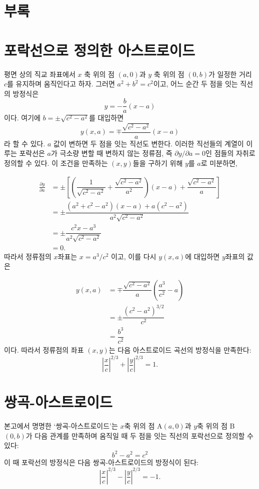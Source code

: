 \documentclass[twocolumn]{article}
\begin{document}
\appendix
\section*{부록}
\newcommand{\pd}[2]{{\frac{\partial #1}{\partial #2}}}
\newcommand{\ilpd}[2]{{{\partial #1}/{\partial #2}}}
\section{포락선으로 정의한 아스트로이드} \label{app:astroid}
평면 상의 직교 좌표에서 $x$ 축 위의 점  $(a, 0)$과 $y$ 축 위의 점 $(0, b)$가 일정한 거리 $c$를 유지하며 움직인다고 하자. 그러면 $a^2+b^2=c^2$이고, 어느 순간 두 점을 잇는 직선의 방정식은 
$$y=-\dfrac{b}{a}(x-a)$$
이다. 여기에 
$b=\pm \sqrt{c^2-a^2}$를 대입하면 
$$y(x, a) = \mp \dfrac{\sqrt{c^2-a^2}}{a}(x-a)$$
라 할 수 있다. 
$a$ 값이 변하면 두 점을 잇는 직선도 변한다. 이러한 직선들의 계열이 이루는 포락선은 $a$가 극소량 변할 때 변하지 않는 정류점, 즉
$\ilpd{y}{a} = 0$인 점들의 자취로 정의할 수 있다. 이 조건을 만족하는 $(x, y)$들을 구하기 위해 $y$를 $a$로 미분하면,

$$ \begin{aligned}
\pd{y}{a} &= \pm\left[\left( \dfrac{1}{\sqrt{c^2-a^2}}+\dfrac{\sqrt{c^2-a^2}}{a^2}\right) (x-a) + \dfrac{\sqrt{c^2-a^2}}{a} \right]\\
	&= \pm \dfrac{(a^2+c^2-a^2)(x-a)+a(c^2-a^2)}{a^2\sqrt{c^2-a^2}}\\
	&= \pm \dfrac{c^2 x - a^3}{a^2 \sqrt{c^2 - a^2}}\\
	&= 0.
\end{aligned}
$$
따라서 정류점의 $x$좌표는 $x = a^3/c^2$ 이고, 이를 다시 $y(x, a)$에 대입하면 $y$좌표의 값은

$$ \begin{aligned}
y(x, a) &= \mp \dfrac{\sqrt{c^2-a^2}}{a}\left(\dfrac{a^3}{c^2}-a\right)\\
	& = \pm \dfrac{\left( c^2- a^2 \right)^{3/2}}{c^2}\\
	& = \dfrac{b^3}{c^2}
\end{aligned}
$$
이다. 따라서 정류점의 좌표 $(x, y)$는 다음 아스트로이드 곡선의 방정식을 만족한다:
$$ \left|\dfrac{x}{c}\right|^{2/3} + \left|\dfrac{y}{c}\right|^{2/3} = 1. $$

\section{쌍곡-아스트로이드}\label{app:hyperastroid}
본고에서 명명한 `쌍곡-아스트로이드'는 $x$축 위의 점 A$(a, 0)$과 $y$축 위의 점 B$(0, b)$가 다음 관계를 만족하며 움직일 때 두 점을 잇는 직선의 포락선으로 정의할 수 있다:
$$b^2-a^2=c^2$$
이 때 포락선의 방정식은 다음 쌍곡-아스트로이드의 방정식이 된다:
$$ \left|\dfrac{x}{c}\right|^{2/3} - \left|\dfrac{y}{c}\right|^{2/3} = -1. $$
\end{document}
